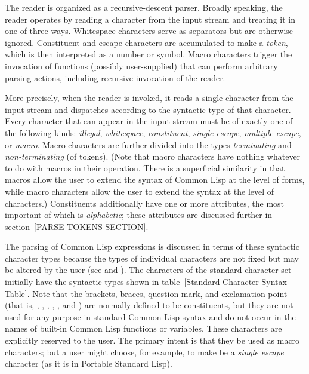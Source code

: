 The reader is organized as a recursive-descent parser.
Broadly speaking,
the reader operates by reading a character from
the input stream and treating it in one of three ways.
Whitespace characters serve as separators but are otherwise
ignored.  Constituent and escape characters are accumulated
to make a {\it token}, which is then interpreted as a number or symbol.
Macro characters trigger the invocation of functions (possibly
user-supplied) that can perform arbitrary parsing actions,
including recursive invocation of the reader.

More precisely,
when the reader is invoked, it reads a single character from the input stream
and dispatches according to the syntactic type of that character.
Every character that can appear in the input stream
must be of exactly one of the following kinds:
{\it illegal},
{\it whitespace},
{\it constituent},
{\it single escape},
{\it multiple escape}, or
{\it macro}.
Macro characters are further divided
into the types {\it terminating} and {\it non-terminating} (of tokens).
(Note that macro characters have nothing whatever to do with macros
in their operation.  There is a superficial similarity in that macros allow
the user to extend the syntax of Common Lisp at the level of forms,
while macro characters allow the user to extend the syntax at the
level of characters.)
Constituents additionally have one or more attributes,
the most important of which is {\it alphabetic}; these attributes are discussed
further in section~\ref{PARSE-TOKENS-SECTION}.

The parsing of Common Lisp expressions is discussed in terms of these
syntactic character types because the types of individual characters
are not fixed
but may be altered by the user (see 
and ).
The characters of the standard character set initially have the
syntactic types shown in table~\ref{Standard-Character-Syntax-Table}.
Note that
the brackets, braces, question mark, and exclamation point
(that is, \cd{{\Xlbracket}}, \cd{{\Xrbracket}}, \cd{{\Xlbrace}},
\cd{{\Xrbrace}}, ,
and \cd{!}) are normally defined to be constituents, but they
are not used for any purpose in standard Common Lisp syntax and do not occur
in the names of built-in Common Lisp functions or variables.
These characters are explicitly reserved to the user.
The primary intent
is that they be used as macro characters; but a user might choose,
for example, to make \cd{!} be a {\it single escape} character
(as it is in Portable Standard Lisp).

